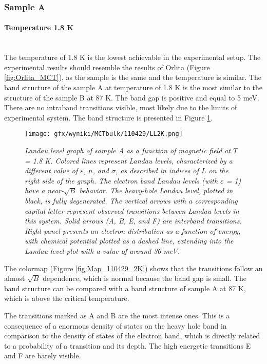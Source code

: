 \documentclass[titlepage,a4paper]{book}
\newcommand{\wciecie}{\quad\phantom{v}}
\newcommand{\myparagraph}[1]{\paragraph{#1}\mbox{}\\}
\begin{document}
\subsubsection{Sample A}
\myparagraph{Temperature 1.8 K}
\wciecie
The temperature of 1.8 K is the lowest achievable in the experimental setup. The experimental results should resemble the results of Orlita \cite{Orlita_MCT} (Figure \ref{fig:Orlita_MCT}), as the sample is the same and the temperature is similar. The band structure of the sample A at temperature of 1.8 K is the most similar to the structure of the sample B at 87 K. The band gap is positive and equal to 5 meV. There are no intraband transitions visible, most likely due to the limits of experimental system. The band structure is presented in Figure \ref{fig:LL_110429_2K}.

\begin{figure}[ht]
	\centering
	\texttt{[image: gfx/wyniki/MCTbulk/110429/LL2K.png]}
	\vspace{-10pt}
	\caption{\textit{Landau level graph of sample A as a function of magnetic field at $T$ = 1.8 K. Colored lines represent Landau levels, characterized by a different value of $\varepsilon$, $n$, and $\sigma$, as described in indices of $L$ on the right side of the graph. The electron band Landau levels (with $\varepsilon$ = 1) have a near-$\sqrt{B}$ behavior. The heavy-hole Landau level, plotted in black, is fully degenerated. The vertical arrows with a corresponding capital letter represent observed transitions between Landau levels in this system. Solid arrows (A, B, E, and F) are interband transitions. Right panel presents an electron distribution as a function of energy, with chemical potential plotted as a dashed line, extending into the Landau level plot with a value of around 36 meV.}}
	\label{fig:LL_110429_2K}
\end{figure}
The colormap (Figure \ref{fig:Map_110429_2K}) shows that the transitions follow an almost $\sqrt{B}$ dependence, which is normal because the band gap is small. The band structure can be compared with a band structure of sample A at 87 K, which is above the critical temperature. 

The transitions marked as A and B are the most intense ones. This is a consequence of a enormous density of states on the heavy hole band in comparison to the density of states of the electron band, which is directly related to a probability of a transition and its depth. The high energetic transitions E and F are barely visible.
\end{document}
